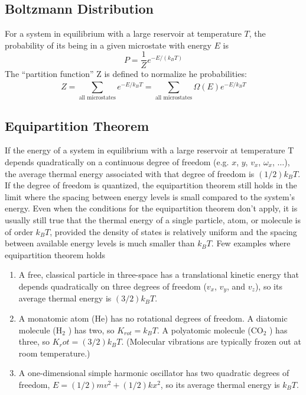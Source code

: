 \documentclass[../../../main.tex]{subfiles}
\begin{document}
\subsection{Boltzmann Distribution}
For a system in equilibrium with a large reservoir at temperature $T$, the probability of its being in a given microstate with energy $E$ is
\begin{equation*}
    P=\frac{1}{Z}e^{-E/(k_BT)}
\end{equation*}
The “partition function” Z is defined to normalize  he probabilities:
\begin{equation*}
    Z=\sum_{\text{all microstates}}^{} e^{-E/k_BT} = \sum_{\text{all microstates}}^{}\Omega(E) e^{-E/k_BT}
\end{equation*}

\subsection{Equipartition Theorem}
If the energy of a system in equilibrium with a large reservoir at temperature T depends quadratically on a continuous degree of freedom (e.g. $x$, $y$, $v_x$, $\omega_x$, $\dots$), the average thermal energy associated with that degree of freedom is $(1/2)k_B T$. If the degree of freedom is quantized, the equipartition theorem still holds in the limit where the spacing between energy levels is small compared to the system's energy. Even when the conditions for the equipartition theorem don't apply, it is usually still true that the thermal energy of a single particle, atom, or molecule is of order $ k_B T$, provided the density of states is relatively
uniform and the spacing between available energy levels is much smaller than $k_B T$. Few examples where equipartition theorem holds
\begin{enumerate}
    \item A free, classical particle in three-space has a translational kinetic energy that depends quadratically on three degrees of freedom ($v_x$, $v_y$, and $v_z$), so its average thermal energy is $(3/2)k_B T$.
    \item A monatomic atom (He) has no rotational degrees of freedom. A diatomic molecule ($\text{H}_2$ ) has two, so $K_{rot} = k_BT$. A polyatomic molecule ($\text{CO}_2$ ) has three, so $K_rot = (3/2)k_B T$. (Molecular vibrations are typically frozen out at room temperature.)
    \item A one-dimensional simple harmonic oscillator has two quadratic degrees of freedom, $E = (1/2)mv^2 + (1/2)kx^2$,  so its average thermal energy is $k_B T$.
\end{enumerate}
\end{document}
